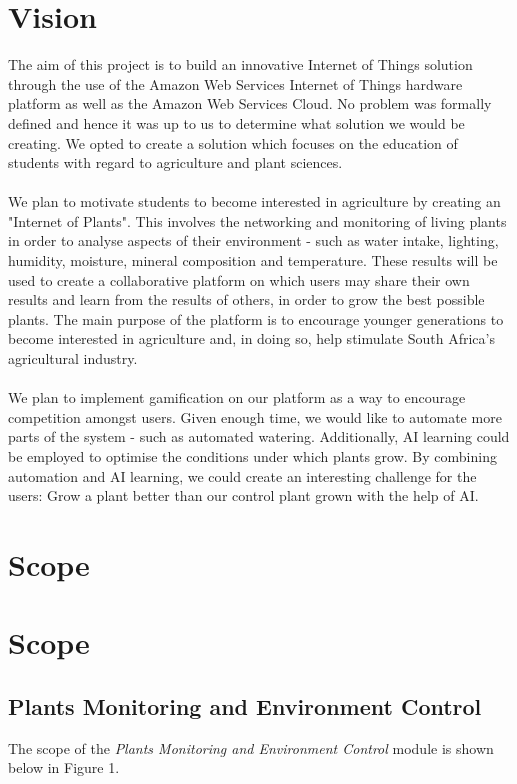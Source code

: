 \documentclass{article}
\begin{document}
\section{Vision}
The aim of this project is to build an innovative Internet of Things solution through the use of the Amazon Web Services Internet of Things hardware platform as well as the Amazon Web Services Cloud. No problem was formally defined and hence it was up to us to determine what solution we would be creating. We opted to create a solution which focuses on the education of students with regard to agriculture and plant sciences.\\\\
We plan to motivate students to become interested in agriculture by creating an "Internet of Plants". This involves the networking and monitoring of living plants in order to analyse aspects of their environment - such as water intake, lighting, humidity, moisture, mineral composition and temperature. These results will be used to create a collaborative platform on which users may share their own results and learn from the results of others, in order to grow the best possible plants. The main purpose of the platform is to encourage younger generations to become interested in agriculture and, in doing so, help stimulate South Africa's agricultural industry.\\\\
We plan to implement gamification on our platform as a way to encourage competition amongst users. Given enough time, we would like to automate more parts of the system - such as automated watering. Additionally, AI learning could be employed to optimise the conditions under which plants grow. By combining automation and AI learning, we could create an interesting challenge for the users: Grow a plant better than our control plant grown with the help of AI.

\section{Scope}
	\section{Scope}
	\subsection{Plants Monitoring and Environment Control}
		The scope of the \emph{Plants Monitoring and Environment Control} module is shown below in Figure 1.
		
\end{document}
